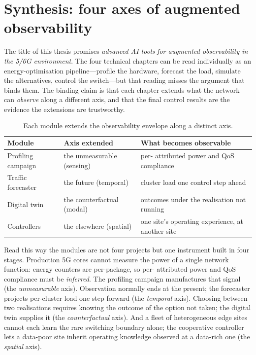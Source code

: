 
\section{Synthesis: four axes of augmented observability}
\label{sec:thesis_synthesis}

The title of this thesis promises \emph{advanced AI tools for augmented
observability in the 5/6G environment}. The four technical chapters can be read
individually as an energy-optimisation pipeline---profile the hardware, forecast
the load, simulate the alternatives, control the switch---but that reading misses
the argument that binds them. The binding claim is that each chapter extends what
the network can \emph{observe} along a different axis, and that the final control
results are the evidence the extensions are trustworthy.

\begin{table}[h]
\centering
\caption{Each module extends the observability envelope along a distinct axis.}
\label{tab:obs_axes}
\begin{tabular}{lll}
\toprule
Module & Axis extended & What becomes observable \\
\midrule
Profiling campaign & the unmeasurable (sensing) & per-\upf{} attributed power and QoS compliance \\
Traffic forecaster & the future (temporal) & cluster load one control step ahead \\
Digital twin & the counterfactual (modal) & outcomes under the realisation not running \\
Controllers & the elsewhere (spatial) & one site's operating experience, at another site \\
\bottomrule
\end{tabular}
\end{table}

Read this way the modules are not four projects but one instrument built in four
stages. Production 5G cores cannot measure the power of a single network
function: energy counters are per-package, so per-\upf{} attributed power and QoS
compliance must be \emph{inferred}. The profiling campaign manufactures that
signal (the \emph{unmeasurable} axis). Observation normally ends at the present;
the forecaster projects per-cluster load one step forward (the \emph{temporal}
axis). Choosing between two \upf{} realisations requires knowing the outcome of
the option not taken; the digital twin supplies it (the \emph{counterfactual}
axis). And a fleet of heterogeneous edge sites cannot each learn the rare
switching boundary alone; the cooperative controller lets a data-poor site
inherit operating knowledge observed at a data-rich one (the \emph{spatial}
axis).


